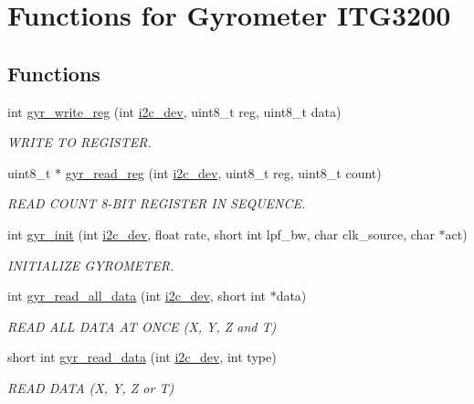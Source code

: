 \hypertarget{group__gyr}{\section{Functions for Gyrometer I\-T\-G3200}
\label{group__gyr}
}
\subsection*{Functions}
\begin{DoxyCompactItemize}
\item 
int \hyperlink{group__gyr_ga3eba167b8ab0614bfe7bafeae8b5570d}{gyr\-\_\-write\-\_\-reg} (int \hyperlink{CommunicationV0_2communication_8c_a7751bd45ac1064efb35adf1f19c25db8}{i2c\-\_\-dev}, uint8\-\_\-t reg, uint8\-\_\-t data)
\begin{DoxyCompactList}\small\item\em W\-R\-I\-T\-E T\-O R\-E\-G\-I\-S\-T\-E\-R. \end{DoxyCompactList}\item 
uint8\-\_\-t $\ast$ \hyperlink{group__gyr_gad817a3b69d4c3026b7a9b6de32753e7b}{gyr\-\_\-read\-\_\-reg} (int \hyperlink{CommunicationV0_2communication_8c_a7751bd45ac1064efb35adf1f19c25db8}{i2c\-\_\-dev}, uint8\-\_\-t reg, uint8\-\_\-t count)
\begin{DoxyCompactList}\small\item\em R\-E\-A\-D C\-O\-U\-N\-T 8-\/\-B\-I\-T R\-E\-G\-I\-S\-T\-E\-R I\-N S\-E\-Q\-U\-E\-N\-C\-E. \end{DoxyCompactList}\item 
int \hyperlink{group__gyr_ga6d02be352b4491a236c9695a6a24d174}{gyr\-\_\-init} (int \hyperlink{CommunicationV0_2communication_8c_a7751bd45ac1064efb35adf1f19c25db8}{i2c\-\_\-dev}, float rate, short int lpf\-\_\-bw, char clk\-\_\-source, char $\ast$act)
\begin{DoxyCompactList}\small\item\em I\-N\-I\-T\-I\-A\-L\-I\-Z\-E G\-Y\-R\-O\-M\-E\-T\-E\-R. \end{DoxyCompactList}\item 
int \hyperlink{group__gyr_ga79875465c3a29fd9ec77308c80a8bc37}{gyr\-\_\-read\-\_\-all\-\_\-data} (int \hyperlink{CommunicationV0_2communication_8c_a7751bd45ac1064efb35adf1f19c25db8}{i2c\-\_\-dev}, short int $\ast$data)
\begin{DoxyCompactList}\small\item\em R\-E\-A\-D A\-L\-L D\-A\-T\-A A\-T O\-N\-C\-E (X, Y, Z and T) \end{DoxyCompactList}\item 
short int \hyperlink{group__gyr_ga271b37e9ace81b18bb2f83787247d262}{gyr\-\_\-read\-\_\-data} (int \hyperlink{CommunicationV0_2communication_8c_a7751bd45ac1064efb35adf1f19c25db8}{i2c\-\_\-dev}, int type)
\begin{DoxyCompactList}\small\item\em R\-E\-A\-D D\-A\-T\-A (X, Y, Z or T) \end{DoxyCompactList}\end{DoxyCompactItemize}


